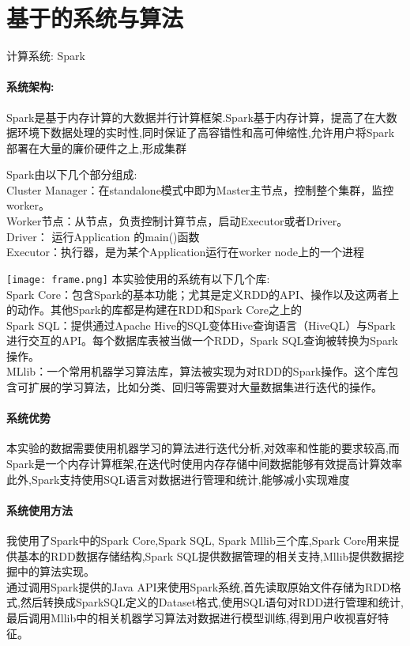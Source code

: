 \documentclass{hitreport}
\begin{document}
\section{基于的系统与算法}
\begin{flushleft}
  计算系统:
  Spark\\
  \paragraph{系统架构:}
  \begin{flushleft}
    Spark是基于内存计算的大数据并行计算框架.Spark基于内存计算，提高了在大数据环境下数据处理的实时性,同时保证了高容错性和高可伸缩性,允许用户将Spark部署在大量的廉价硬件之上,形成集群\par
    Spark由以下几个部分组成:\\
    Cluster Manager：在standalone模式中即为Master主节点，控制整个集群，监控worker。\\
    Worker节点：从节点，负责控制计算节点，启动Executor或者Driver。\\
    Driver： 运行Application 的main()函数\\
    Executor：执行器，是为某个Application运行在worker node上的一个进程\par
    \texttt{[image: frame.png]}
    本实验使用的系统有以下几个库:\\
    Spark Core：包含Spark的基本功能；尤其是定义RDD的API、操作以及这两者上的动作。其他Spark的库都是构建在RDD和Spark Core之上的\\
    Spark SQL：提供通过Apache Hive的SQL变体Hive查询语言（HiveQL）与Spark进行交互的API。每个数据库表被当做一个RDD，Spark SQL查询被转换为Spark操作。\\
    MLlib：一个常用机器学习算法库，算法被实现为对RDD的Spark操作。这个库包含可扩展的学习算法，比如分类、回归等需要对大量数据集进行迭代的操作。\\
  \end{flushleft}
  \paragraph{系统优势}
  \begin{flushleft}
    本实验的数据需要使用机器学习的算法进行迭代分析,对效率和性能的要求较高,而Spark是一个内存计算框架,在迭代时使用内存存储中间数据能够有效提高计算效率\\
    此外,Spark支持使用SQL语言对数据进行管理和统计,能够减小实现难度
  \end{flushleft}
  \paragraph{系统使用方法}
  \begin{flushleft}
    我使用了Spark中的Spark Core,Spark SQL, Spark Mllib三个库,Spark Core用来提供基本的RDD数据存储结构,Spark SQL提供数据管理的相关支持,Mllib提供数据挖掘中的算法实现。\\
    通过调用Spark提供的Java API来使用Spark系统,首先读取原始文件存储为RDD格式,然后转换成SparkSQL定义的Dataset格式,使用SQL语句对RDD进行管理和统计,最后调用Mllib中的相关机器学习算法对数据进行模型训练,得到用户收视喜好特征。
  \end{flushleft}


\end{flushleft}
\end{document}
